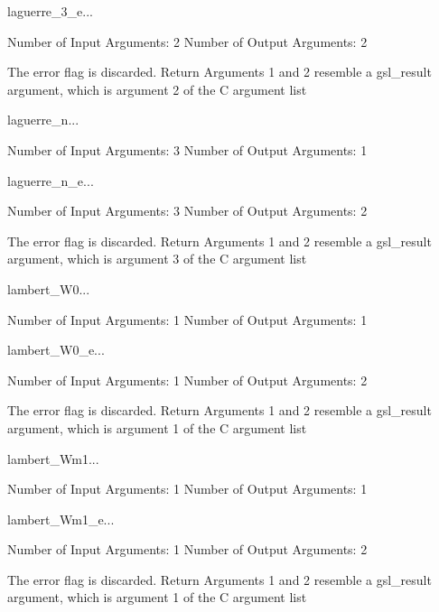 \begin{funcdesc}{laguerre_3_e}{...}

    Number of Input  Arguments:  2
    Number of Output Arguments:  2

The error flag is discarded.
Return Arguments 1 and 2 resemble a gsl_result argument,
	which is  argument 2 of the C argument list

\end{funcdesc}

\begin{funcdesc}{laguerre_n}{...}

    Number of Input  Arguments:  3
    Number of Output Arguments:  1
\end{funcdesc}

\begin{funcdesc}{laguerre_n_e}{...}

    Number of Input  Arguments:  3
    Number of Output Arguments:  2

The error flag is discarded.
Return Arguments 1 and 2 resemble a gsl_result argument,
	which is  argument 3 of the C argument list

\end{funcdesc}

\begin{funcdesc}{lambert_W0}{...}

    Number of Input  Arguments:  1
    Number of Output Arguments:  1
\end{funcdesc}

\begin{funcdesc}{lambert_W0_e}{...}

    Number of Input  Arguments:  1
    Number of Output Arguments:  2

The error flag is discarded.
Return Arguments 1 and 2 resemble a gsl_result argument,
	which is  argument 1 of the C argument list

\end{funcdesc}

\begin{funcdesc}{lambert_Wm1}{...}

    Number of Input  Arguments:  1
    Number of Output Arguments:  1
\end{funcdesc}

\begin{funcdesc}{lambert_Wm1_e}{...}

    Number of Input  Arguments:  1
    Number of Output Arguments:  2

The error flag is discarded.
Return Arguments 1 and 2 resemble a gsl_result argument,
	which is  argument 1 of the C argument list

\end{funcdesc}

